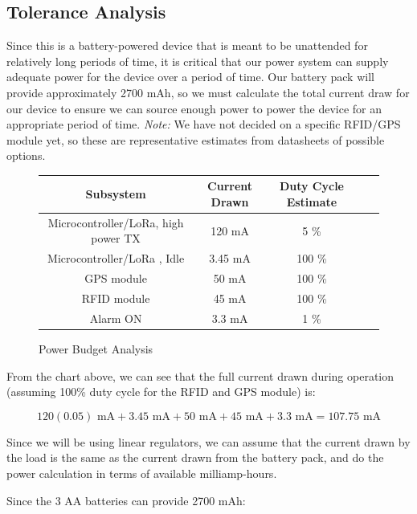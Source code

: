 \documentclass{article}
\begin{document}
\subsection{Tolerance Analysis}

Since this is a battery-powered device that is meant to be unattended for relatively long periods of time, it is critical that our power system can supply adequate power for the device over a period of time. Our battery pack will provide approximately 2700 mAh, so we must calculate the total current draw for our device to ensure we can source enough power to power the device for an appropriate period of time. \textit{Note:} We have not decided on a specific RFID/GPS module yet, so these are representative estimates from datasheets of possible options. 

\begin{figure}[H]
	\begin{center}
		\begin{tabular}{|c|c|c|c|c|}
			\hline
			\textbf{Subsystem} &  \textbf{Current Drawn} & \textbf{Duty Cycle Estimate} \\
			\hline
			Microcontroller/LoRa, high power TX \cite{stm_datasheet} & 120 mA & 5 \% \\
			\hline
			Microcontroller/LoRa \cite{stm_datasheet}, Idle & 3.45 mA & 100 \% \\
			\hline 
			GPS module \cite{gps} & 50 mA & 100 \% \\
			\hline
			RFID module \cite{rfid} & 45 mA & 100 \% \\ 
			\hline 
			Alarm ON & 3.3 mA & 1 \% \\ 
			\hline
			
		
		\end{tabular}
	\end{center}
	\caption{Power Budget Analysis}
\end{figure}

From the chart above, we can see that the full current drawn during operation (assuming 100\% duty cycle for the RFID and GPS module) is: 

$$ 
120(0.05) \text{ mA}+ 3.45 \text{ mA}+ 50\text{ mA} + 45\text{ mA} + 3.3 \text{ mA}= 107.75 \text{ mA}
$$


Since we will be using linear regulators, we can assume that the current drawn by the load is the same as the current drawn from the battery pack, and do the power calculation in terms of available milliamp-hours. 

Since the 3 AA batteries can provide 2700 mAh: 
\end{document}
